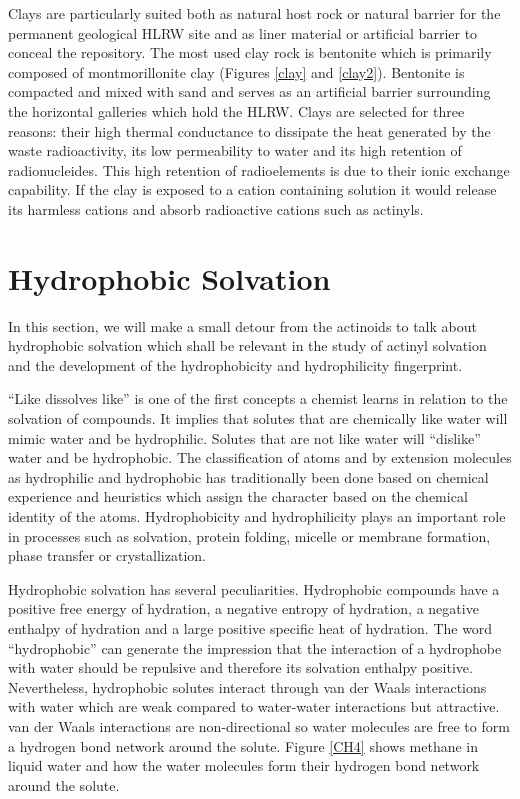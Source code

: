 Clays are particularly suited both as natural host rock or natural barrier for the permanent 
geological HLRW site and as liner material or artificial barrier to conceal the 
repository.\cite{Delage2010} The most used clay rock is bentonite which is primarily 
composed of montmorillonite clay (Figures \ref{clay} and \ref{clay2}). Bentonite is compacted 
and mixed with sand 
and serves as an 
artificial barrier surrounding the horizontal galleries which hold the HLRW. Clays are selected 
for three reasons: their high thermal conductance to dissipate the heat generated by the 
waste radioactivity, its low permeability to water and its high retention of radionucleides. 
This high retention of radioelements is due to their ionic exchange capability. If the
clay is exposed to a cation containing solution it would release its harmless  cations and 
absorb radioactive cations such as actinyls.

\section{Hydrophobic Solvation}\label{sec:hydrophobicity}
In this section, we will make a small detour from the actinoids to talk about hydrophobic solvation 
which shall be relevant in the study of actinyl solvation and the development of the hydrophobicity 
and hydrophilicity fingerprint.

``Like dissolves like'' is one of the first concepts a chemist learns in relation to the 
solvation 
of compounds.\cite{reichardt2011solvents-ch1} It implies that solutes that are chemically like 
water 
will mimic water and be 
hydrophilic. Solutes that are not like water will ``dislike'' water and be 
hydrophobic. The classification of atoms and by extension molecules as hydrophilic and hydrophobic 
has traditionally been done based on chemical experience and heuristics which assign the character 
based on the chemical identity of the atoms. Hydrophobicity and hydrophilicity plays an important 
role in 
processes such as solvation, protein folding, micelle or membrane formation, phase transfer or 
crystallization.  

Hydrophobic solvation has several peculiarities. Hydrophobic compounds have a positive free energy 
of hydration, a negative entropy of hydration, a negative enthalpy of hydration and a large 
positive specific heat of hydration\cite{Harris2016,Ben-Amotz2016}. The word ``hydrophobic'' can 
generate the impression that the interaction of a hydrophobe with water should be repulsive and 
therefore its solvation enthalpy positive. Nevertheless, hydrophobic solutes interact through van 
der Waals interactions with water which are weak compared to water-water interactions but 
attractive. van der 
Waals interactions are non-di\-rec\-tio\-nal so water molecules are free to form a hydrogen 
bond 
network around the solute. Figure \ref{CH4} shows methane in liquid water and how the water 
molecules form their hydrogen bond network around the solute.

